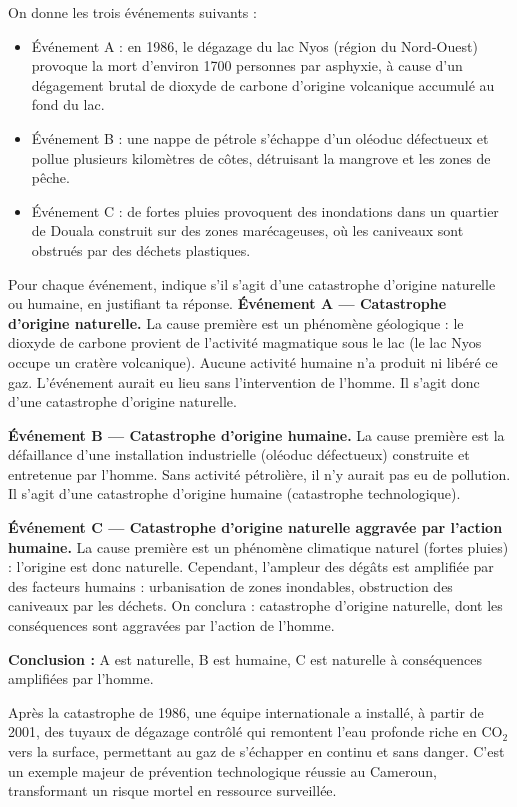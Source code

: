 \documentclass[11pt]{article}
\newcommand{\cle}[1]{{\popxbold\color{popdark}#1}}
\begin{document}
\begin{exoresolu}
On donne les trois événements suivants :
\begin{itemize}
\item Événement A : en 1986, le dégazage du lac Nyos (région du Nord-Ouest) provoque la mort d'environ \num{1700} personnes par asphyxie, à cause d'un dégagement brutal de dioxyde de carbone d'origine volcanique accumulé au fond du lac.
\item Événement B : une nappe de pétrole s'échappe d'un oléoduc défectueux et pollue plusieurs kilomètres de côtes, détruisant la mangrove et les zones de pêche.
\item Événement C : de fortes pluies provoquent des inondations dans un quartier de Douala construit sur des zones marécageuses, où les caniveaux sont obstrués par des déchets plastiques.
\end{itemize}
Pour chaque événement, indique s'il s'agit d'une catastrophe d'origine naturelle ou humaine, en justifiant ta réponse.
\tcblower
\textbf{Événement A — Catastrophe d'origine naturelle.} La cause première est un phénomène géologique : le dioxyde de carbone provient de l'activité magmatique sous le lac (le lac Nyos occupe un cratère volcanique). Aucune activité humaine n'a produit ni libéré ce gaz. L'événement aurait eu lieu sans l'intervention de l'homme. Il s'agit donc d'une catastrophe d'origine \cle{naturelle}.

\textbf{Événement B — Catastrophe d'origine humaine.} La cause première est la défaillance d'une installation industrielle (oléoduc défectueux) construite et entretenue par l'homme. Sans activité pétrolière, il n'y aurait pas eu de pollution. Il s'agit d'une catastrophe d'origine \cle{humaine} (catastrophe technologique).

\textbf{Événement C — Catastrophe d'origine naturelle aggravée par l'action humaine.} La cause première est un phénomène climatique naturel (fortes pluies) : l'origine est donc naturelle. Cependant, l'ampleur des dégâts est amplifiée par des facteurs humains : urbanisation de zones inondables, obstruction des caniveaux par les déchets. On conclura : catastrophe d'origine naturelle, dont les conséquences sont aggravées par l'action de l'homme.

\textbf{Conclusion :} A est naturelle, B est humaine, C est naturelle à conséquences amplifiées par l'homme.
\end{exoresolu}

\begin{savaistu}
Après la catastrophe de 1986, une équipe internationale a installé, à partir de 2001, des tuyaux de \cle{dégazage contrôlé} qui remontent l'eau profonde riche en CO$_2$ vers la surface, permettant au gaz de s'échapper en continu et sans danger. C'est un exemple majeur de \cle{prévention} technologique réussie au Cameroun, transformant un risque mortel en ressource surveillée.
\end{savaistu}
\end{document}

